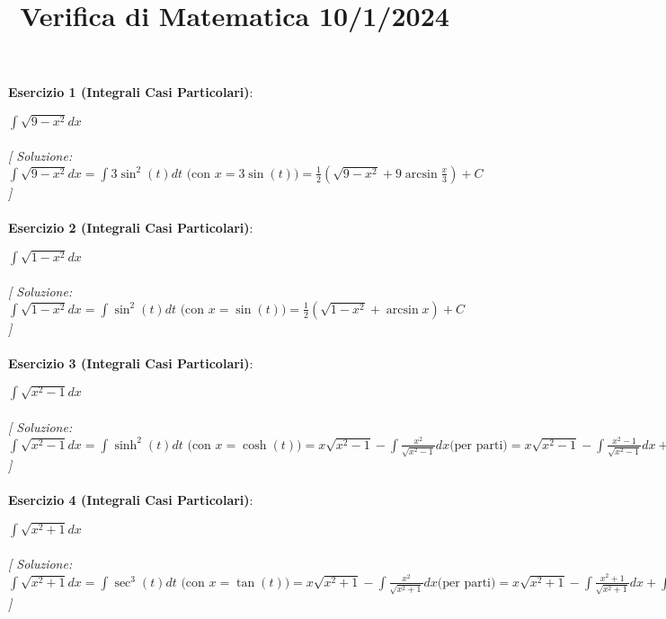 \documentclass{article}
\title{\raggedright Verifica di Matematica  10/1/2024}
\date{}
\begin{document}
\maketitle

\textbf{Esercizio 1 (Integrali Casi Particolari)}:\\
\par $\int \sqrt{9-x^2}  dx$ \\\\

\textit{[ Soluzione: $\int \sqrt{9-x^2} dx = \int 3\sin^2(t) dt \text{ (con } x=3\sin(t)) =\frac{1}{2}(\sqrt{9-x^2}+9\arcsin {\frac{x}{3}}) + C$ ]}\\\\

\textbf{Esercizio 2 (Integrali Casi Particolari)}:\\
\par $\int \sqrt{1-x^2} dx$ \\\\

\textit{[ Soluzione: $\int \sqrt{1-x^2}  dx = \int \sin^2(t) dt \text{ (con } x=\sin(t))=\frac{1}{2}(\sqrt{1-x^2}+\arcsin x) + C$ ]}\\\\

\textbf{Esercizio 3 (Integrali Casi Particolari)}:\\
\par $\int \sqrt{x^2-1}  dx$ \\\\

\textit{[ Soluzione: $\int \sqrt{x^2-1}  dx = \int \sinh^2(t) dt \text{ (con } x=\cosh(t))=x\sqrt{x^2-1}-\int \frac{x^2}{\sqrt{x^2-1}} dx \text{(per parti)}=x\sqrt{x^2-1}-\int \frac{x^2-1}{\sqrt{x^2-1}} dx+\int \frac{1}{\sqrt{x^2-1}} dx=\frac{1}{2}(x \sqrt{x^2-1}-\log{\sqrt{x^2-1} + x}) + C$ ]}\\\\

\textbf{Esercizio 4 (Integrali Casi Particolari)}:\\
\par $\int \sqrt{x^2+1}  dx$ \\\\

\textit{[ Soluzione: $\int \sqrt{x^2+1}  dx = \int \sec^3(t) dt \text{ (con } x=\tan(t))=x\sqrt{x^2+1}-\int \frac{x^2}{\sqrt{x^2+1}} dx \text{(per parti)}=x\sqrt{x^2+1}-\int \frac{x^2+1}{\sqrt{x^2+1}} dx+\int \frac{1}{\sqrt{x^2+1}} dx=\frac{1}{2}(x\sqrt{x^2+1}+log{(x+\sqrt{x^2+1})}+ C$ ]}\\\\
\end{document}
